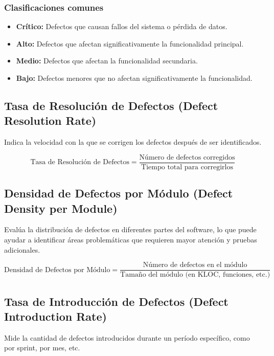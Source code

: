 \documentclass{article}
\begin{document}
\subsubsection{Clasificaciones comunes}
\begin{itemize}
  \item \textbf{Crítico:} Defectos que causan fallos del sistema o pérdida de datos.
  \item \textbf{Alto:} Defectos que afectan significativamente la funcionalidad principal.
  \item \textbf{Medio:} Defectos que afectan la funcionalidad secundaria.
  \item \textbf{Bajo:} Defectos menores que no afectan significativamente la funcionalidad.
\end{itemize}

\subsection{Tasa de Resolución de Defectos (Defect Resolution Rate)}
Indica la velocidad con la que se corrigen los defectos después de ser identificados.

\begin{equation}
  \text{Tasa de Resolución de Defectos} = \frac{\text{Número de defectos corregidos}}{\text{Tiempo total para corregirlos}}
\end{equation}

\subsection{Densidad de Defectos por Módulo (Defect Density per Module)}
Evalúa la distribución de defectos en diferentes partes del software, lo que puede ayudar a identificar áreas problemáticas que requieren mayor atención y pruebas adicionales.

\begin{equation}
  \text{Densidad de Defectos por Módulo} = \frac{\text{Número de defectos en el módulo}}{\text{Tamaño del módulo (en KLOC, funciones, etc.)}}
\end{equation}

\subsection{Tasa de Introducción de Defectos (Defect Introduction Rate)}
Mide la cantidad de defectos introducidos durante un período específico, como por sprint, por mes, etc.
\end{document}
